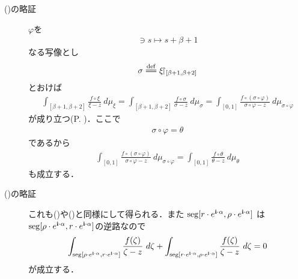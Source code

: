 \begin{description}
		\item[()の略証]
			$\varphi$を
			\begin{align}
				[0,1] \ni s \longmapsto s + \beta + 1
			\end{align}
			なる写像とし
			\begin{align}
				\sigma \defeq \xi \rest_{[\beta+1,\beta+2]}
			\end{align}
			とおけば
			\begin{align}
				\int_{[\beta+1,\beta+2]} \frac{f \circ \xi}{\xi - z}\ d\mu_{\xi}
				= \int_{[\beta+1,\beta+2]} \frac{f \circ \sigma}{\sigma - z}\ d\mu_{\sigma}
				= \int_{[0,1]} \frac{f \circ (\sigma \circ \varphi)}{\sigma \circ \varphi - z}\ d\mu_{\sigma \circ \varphi}
			\end{align}
			が成り立つ(P. \pageref{fom:change_of_parameter_interval_complex_contour_integral})．ここで
			\begin{align}
				\sigma \circ \varphi = \theta
			\end{align}
			であるから
			\begin{align}
				\int_{[0,1]} \frac{f \circ (\sigma \circ \varphi)}{\sigma \circ \varphi - z}\ d\mu_{\sigma \circ \varphi}
				= \int_{[0,1]} \frac{f \circ \theta}{\theta - z}\ d\mu_{\theta}
			\end{align}
			も成立する．
			
		\item[()の略証]
			これも()や()と同様にして得られる．また
			$\operatorname{seg}[r \cdot e^{\mathbf{i} \cdot \alpha},\rho \cdot e^{\mathbf{i} \cdot \alpha}]$
			は$\operatorname{seg}[\rho \cdot e^{\mathbf{i} \cdot \alpha},r \cdot e^{\mathbf{i} \cdot \alpha}]$の逆路なので
			\begin{align}
				\int_{\operatorname{seg}[\rho \cdot e^{\mathbf{i} \cdot \alpha},r \cdot e^{\mathbf{i} \cdot \alpha}]} \frac{f(\zeta)}{\zeta - z}\ d\zeta
				+ \int_{\operatorname{seg}[r \cdot e^{\mathbf{i} \cdot \alpha},\rho \cdot e^{\mathbf{i} \cdot \alpha}]} \frac{f(\zeta)}{\zeta - z}\ d\zeta 
				= 0
			\end{align}
			が成立する．
			

\end{description}
